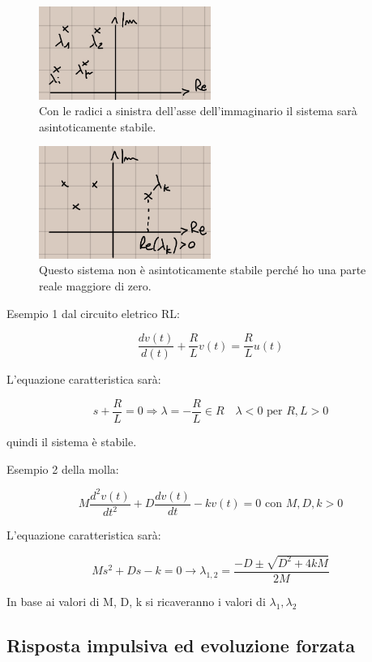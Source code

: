 \documentclass[a4paper, 12pt]{book}
\theoremstyle{plain}
\begin{document}
\begin{figure}
    \includegraphics[width=0.5\textwidth]{radici.jpg}
    \caption{Con le radici a sinistra dell'asse dell'immaginario il sistema sarà asintoticamente stabile.}
\end{figure}

\begin{figure}
    \includegraphics[width=0.5\textwidth]{radici2.jpg}
    \caption{Questo sistema non è asintoticamente stabile perché ho una parte reale maggiore di zero.}
\end{figure}

Esempio 1 dal circuito eletrico RL:

\[
    \frac{dv(t)}{d(t)} + \frac{R}{L}v(t) = \frac{R}{L}u(t)
\]

L'equazione caratteristica sarà:

\[
    s + \frac{R}{L} = 0 \Rightarrow \lambda = -\frac{R}{L} \in R \quad \lambda < 0 \textrm{ per } R,L>0
\]

quindi il sistema è stabile.

Esempio 2 della molla:

\[
    M\frac{d^2v(t)}{dt^2} + D\frac{dv(t)}{dt} - kv(t) = 0 \textrm{ con } M, D, k > 0
\]

L'equazione caratteristica sarà:

\[
    Ms^2 + Ds - k = 0 \rightarrow \lambda_{1,2} = \frac{-D\pm \sqrt{D^2 + 4kM}}{2M}
\]

In base ai valori di M, D, k si ricaveranno i valori di $\lambda_1, \lambda_2$

\subsection{Risposta impulsiva ed evoluzione forzata}
\end{document}

